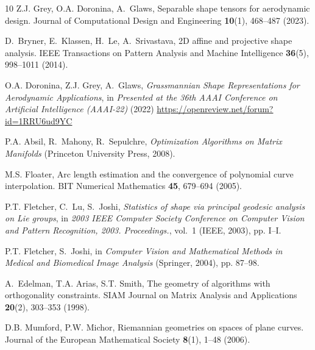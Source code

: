 \documentclass[pdflatex,iicol]{sn-jnl}%
\theoremstyle{thmstyleone}%
\theoremstyle{thmstyletwo}%
\theoremstyle{thmstylethree}%
\begin{document}
\begin{thebibliography}{10}
Z.J. Grey, O.A. Doronina, A.~Glaws, {Separable shape tensors for aerodynamic design}.
\newblock Journal of Computational Design and Engineering \textbf{10}(1), 468--487 (2023).
\newblock {}

D.~Bryner, E.~Klassen, H.~Le, A.~Srivastava, 2{D} affine and projective shape analysis.
\newblock IEEE Transactions on Pattern Analysis and Machine Intelligence \textbf{36}(5), 998--1011 (2014).
\newblock {}

O.A. Doronina, Z.J. Grey, A.~Glaws, \emph{Grassmannian Shape Representations for Aerodynamic Applications}, in \emph{Presented at the 36th AAAI Conference on Artificial Intelligence (AAAI-22)} (2022)
\newblock \urlprefix\url{https://openreview.net/forum?id=1RRU6ud9YC}

P.A. Absil, R.~Mahony, R.~Sepulchre, \emph{Optimization Algorithms on Matrix Manifolds} (Princeton University Press, 2008).
\newblock {}

M.S. Floater, Arc length estimation and the convergence of polynomial curve interpolation.
\newblock BIT Numerical Mathematics \textbf{45}, 679--694 (2005).
\newblock {}

P.T. Fletcher, C.~Lu, S.~Joshi, \emph{Statistics of shape via principal geodesic analysis on {L}ie groups}, in \emph{2003 IEEE Computer Society Conference on Computer Vision and Pattern Recognition, 2003. Proceedings.}, vol.~1 (IEEE, 2003), pp. I--I.
\newblock {}

P.T. Fletcher, S.~Joshi, in \emph{{Computer Vision and Mathematical Methods in Medical and Biomedical Image Analysis}} (Springer, 2004), pp. 87--98.
\newblock {}

A.~Edelman, T.A. Arias, S.T. Smith, The geometry of algorithms with orthogonality constraints.
\newblock SIAM Journal on Matrix Analysis and Applications \textbf{20}(2), 303--353 (1998).
\newblock {}

D.B. Mumford, P.W. Michor, Riemannian geometries on spaces of plane curves.
\newblock Journal of the European Mathematical Society \textbf{8}(1), 1--48 (2006).
\newblock {}


\end{thebibliography}
\end{document}
